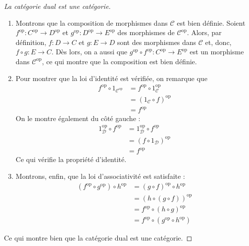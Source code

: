 \documentclass{article}
\begin{document}
\begin{proof}[La catégorie dual est une catégorie]{}
    \begin{enumerate}
        \item Montrons que la composition de morphismes dans $\mathcal C$ est bien définie. Soient $f^\text{op}:C^\text{op}\to D^\text{op}$ et $g^\text{op}:D^\text{op}\to E^\text{op}$ des morphismes de $\mathcal C^\text{op}$. Alors, par définition, $f:D\to C$ et $g:E\to D$ sont des morphismes dans $\mathcal C$ et, donc, $f\circ g:E\to C$. Dès lors, on a aussi que $g^\text{op}\circ f^\text{op}:C^\text{op}\to E^\text{op}$ est un morphisme dans $\mathcal C^\text{op}$, ce qui montre que la composition est bien définie.
        \item Pour montrer que la loi d'identité est vérifiée, on remarque que
            \begin{equation*}
            \begin{aligned}
                f^\text{op}\circ1_{\mathcal C^\text{op}}&=f^\text{op}\circ 1_\mathcal C^\text{op}\\
                                                        &=(1_\mathcal C\circ f)^\text{op}\\
                                                        &=f^\text{op}
            \end{aligned}
            \end{equation*}
            On le montre également du côté gauche :
            \begin{equation*}
            \begin{aligned}
                1_\mathcal D^\text{op}\circ f^\text{op}&=1_\mathcal D^\text{op}\circ f^\text{op}\\
                                                       &=(f\circ1_\mathcal D)^\text{op}\\
                                                       &=f^\text{op}
            \end{aligned}
            \end{equation*}
            Ce qui vérifie la propriété d'identité.
        \item Montrons, enfin, que la loi d'associativité est satisfaite :
            \begin{equation*}
            \begin{aligned}
                (f^\text{op}\circ g^\text{op})\circ h^\text{op}&=(g\circ f)^\text{op}\circ h^\text{op}\\
                                                               &=(h\circ(g\circ f))^\text{op}\\
                                                               &=f^\text{op}\circ(h\circ g)^\text{op}\\
                                                               &=f^\text{op}\circ(g^\text{op}\circ h^\text{op})
            \end{aligned}
            \end{equation*}
    \end{enumerate}

    \noindent
    Ce qui montre bien que la catégorie dual est une catégorie.
\end{proof}
\end{document}
